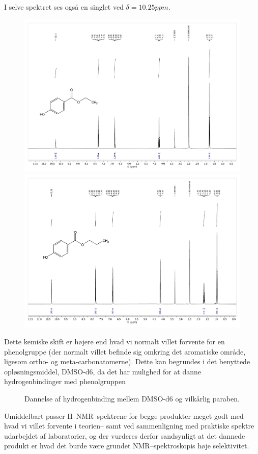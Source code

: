     I selve spektret ses også en singlet ved $\delta=10.25\si{ppm}$. 
    \begin{figure}[H]\centering
        \includegraphics[width=.48\textwidth,page=1]{bilag/ethylnmr}
        \includegraphics[width=.48\textwidth,page=1]{bilag/propylnmr}
    \end{figure}
    Dette kemiske skift er højere end hvad vi normalt villet forvente for en phenolgruppe (der normalt villet befinde sig omkring det aromatiske område, ligesom ortho- og meta-carbonatomerne). Dette kan begrundes i det benyttede opløsningsmiddel, DMSO-d6, da det har mulighed for at danne hydrogenbindinger med phenolgruppen \parencite{Raym2007}
    \begin{figure}[H]\centering
        \caption{Dannelse af hydrogenbinding mellem DMSO-d6 og vilkårlig paraben.}
    \end{figure}
    Umiddelbart passer H--NMR--spektrene for begge produkter meget godt med hvad vi villet forvente i teorien-- samt ved sammenligning med praktiske spektre udarbejdet af laboratorier, og der vurderes derfor sandsynligt at det dannede produkt er hvad det burde være grundet NMR--spektroskopis høje selektivitet.
